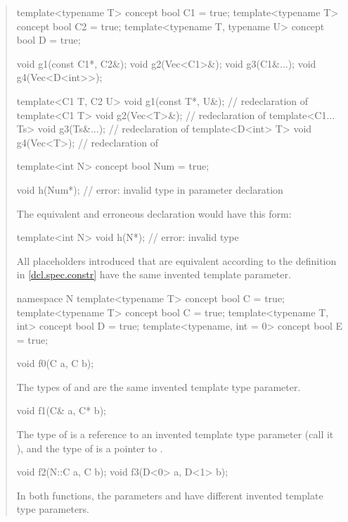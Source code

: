 \begin{quote}
\begin{codeblock}
template<typename T> concept bool C1 = true;
template<typename T> concept bool C2 = true;
template<typename T, typename U> concept bool D = true;

void g1(const C1*, C2&);
void g2(Vec<C1>&);
void g3(C1&...);
void g4(Vec<D<int>>);

template<C1 T, C2 U> void g1(const T*, U&); // redeclaration of 
template<C1 T> void g2(Vec<T>&);            // redeclaration of 
template<C1... Ts> void g3(Ts&...);         // redeclaration of 
template<D<int> T> void g4(Vec<T>);         // redeclaration of 
\end{codeblock}
\exitexample
% 
\enterexample
\begin{codeblock}
template<int N> concept bool Num = true;

void h(Num*); // error: invalid type in parameter declaration
\end{codeblock}
The equivalent and erroneous declaration would have this form:
\begin{codeblock}
template<int N> void h(N*); // error: invalid type
\end{codeblock}
\exitexample

\pnum
All placeholders introduced
that are equivalent according to the definition in
\ref{dcl.spec.constr} have the
same invented template parameter.
\enterexample
\begin{codeblock}
namespace N {
  template<typename T> concept bool C = true;
}
template<typename T> concept bool C = true;
template<typename T, int> concept bool D = true;
template<typename, int = 0> concept bool E = true;

void f0(C a, C b);
\end{codeblock}
The types of  and  are the same invented template
type parameter.

\begin{codeblock}
void f1(C& a, C* b);
\end{codeblock}
The type of  is a reference to an invented template type parameter 
(call it ), and the type of  is a pointer to 
.

\begin{codeblock}
void f2(N::C a, C b);
void f3(D<0> a, D<1> b);
\end{codeblock}
In both functions, the parameters  and
 have different invented template type parameters.


\end{quote}
